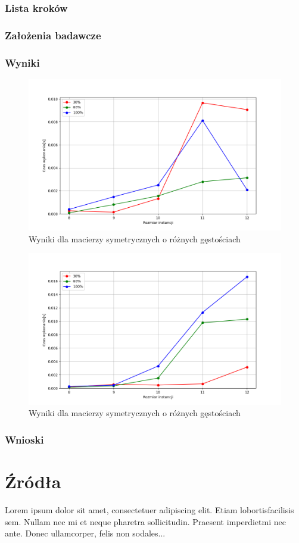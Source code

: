 \documentclass{article}
\begin{document}
  \subsubsection{Lista kroków}
  \subsubsection{Założenia badawcze}
  \subsubsection{Wyniki}
  
  \FloatBarrier
  
  \begin{figure}[ht]
    \centering
    \includegraphics[width=\textwidth]{src/plots/asymleastCostresoult.png}
    \caption{Wyniki dla macierzy symetrycznych o różnych gęstościach}
    \label{fig:asm_lc}
  \end{figure}
  \begin{figure}[ht]
    \centering
    \includegraphics[width=\textwidth]{src/plots/symleastCostresoult.png}
    \caption{Wyniki dla macierzy symetrycznych o różnych gęstościach}
    \label{fig:sm_lc}
  \end{figure}
  \FloatBarrier
  \subsubsection{Wnioski}
  
  \section{Źródła}
  Lorem  ipsum  dolor  sit  amet,  consectetuer  adipiscing  
  elit.   Etiam  lobortisfacilisis sem.  Nullam nec mi et 
  neque pharetra sollicitudin.  Praesent imperdietmi nec ante. 
  Donec ullamcorper, felis non sodales...
\end{document}
